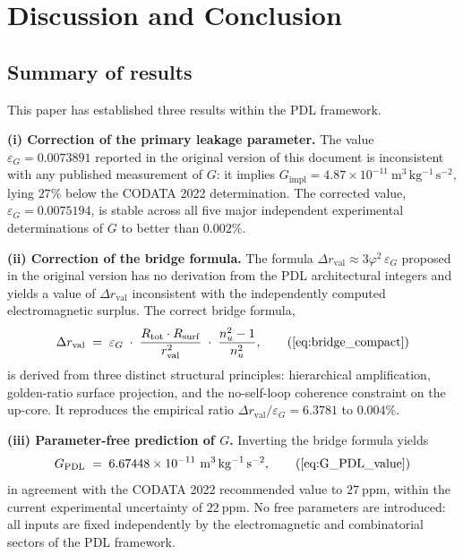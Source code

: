 \documentclass[11pt,a4paper]{article}
\begin{document}

\section{Discussion and Conclusion}
\label{sec:discussion}

\subsection{Summary of results}

This paper has established three results within the PDL framework.

\textbf{(i) Correction of the primary leakage parameter.} The value $\varepsilon_G = 0.0073891$ reported in the original version of this document is inconsistent with any published measurement of $G$: it implies $G_{\mathrm{impl}} = 4.87 \times 10^{-11}\ \mathrm{m^3\,kg^{-1}\,s^{-2}}$, lying $27\%$ below the CODATA 2022 determination. The corrected value, $\varepsilon_G = 0.0075194$, is stable across all five major independent experimental determinations of $G$ to better than $0.002\%$.

\textbf{(ii) Correction of the bridge formula.}
The formula $\Delta r_{\mathrm{val}} \approx 3\varphi^2\,\varepsilon_G$ proposed in the original version has no derivation from the PDL architectural integers and yields a value of $\Delta r_{\mathrm{val}}$ inconsistent with the independently computed electromagnetic surplus. The correct bridge formula,
\begin{equation}
    \Delta r_{\mathrm{val}} 
    \;=\; \varepsilon_G\;\cdot\;
    \frac{R_{\mathrm{tot}}\cdot R_{\mathrm{surf}}}{r_{\mathrm{val}}^2}
    \;\cdot\;
    \frac{n_u^2 - 1}{n_u^2},
    \tag{\ref{eq:bridge_compact}}
\end{equation}
is derived from three distinct structural principles: hierarchical amplification, golden-ratio surface projection, and the no-self-loop coherence constraint on the up-core. It reproduces the empirical ratio $\Delta r_{\mathrm{val}}/\varepsilon_G = 6.3781$ to $0.004\%$.

\textbf{(iii) Parameter-free prediction of $G$.}
Inverting the bridge formula yields
\begin{equation}
    G_{\mathrm{PDL}} 
    \;=\; 6.67448 \times 10^{-11}\ 
          \mathrm{m^3\,kg^{-1}\,s^{-2}},
    \tag{\ref{eq:G_PDL_value}}
\end{equation}
in agreement with the CODATA 2022 recommended value to $27\ \mathrm{ppm}$, within the current experimental uncertainty of $22\ \mathrm{ppm}$. No free parameters are introduced: all inputs are fixed independently by the electromagnetic and combinatorial sectors of the PDL framework.
\end{document}
